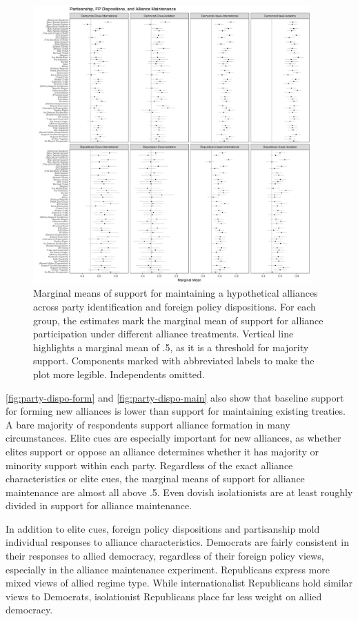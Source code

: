 \documentclass[12pt]{article}
\begin{document}
\begin{figure}
	\centering
		\includegraphics[width=0.95\textwidth]{../figures/party-dispo-main.png}
	\caption{Marginal means of support for maintaining a hypothetical alliances across party identification and foreign policy dispositions. For each group, the estimates mark the marginal mean of support for alliance participation under different alliance treatments. Vertical line highlights a marginal mean of .5, as it is a threshold for majority support. Components marked with abbreviated labels to make the plot more legible. Independents omitted.}
	\label{fig:party-dispo-main}
\end{figure}


\autoref{fig:party-dispo-form} and \autoref{fig:party-dispo-main} also show that baseline support for forming new alliances is lower than support for maintaining existing treaties. 
A bare majority of respondents support alliance formation in many circumstances. 
Elite cues are especially important for new alliances, as whether elites support or oppose an alliance determines whether it has majority or minority support within each party. 
Regardless of the exact alliance characteristics or elite cues, the marginal means of support for alliance maintenance are almost all above .5. 
Even dovish isolationists are at least roughly divided in support for alliance maintenance.


In addition to elite cues, foreign policy dispositions and partisanship mold individual responses to alliance characteristics. 
Democrats are fairly consistent in their responses to allied democracy, regardless of their foreign policy views, especially in the alliance maintenance experiment. 
Republicans express more mixed views of allied regime type. 
While internationalist Republicans hold similar views to Democrats, isolationist Republicans place far less weight on allied democracy. 
\end{document}
